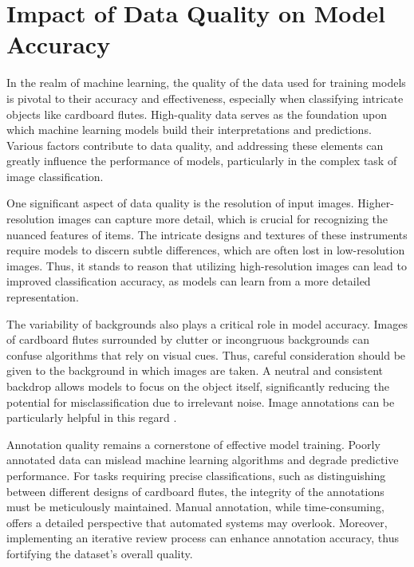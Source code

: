 \section{Impact of Data Quality on Model Accuracy}

In the realm of machine learning, the quality of the data used for training models is pivotal to their accuracy and effectiveness, especially when classifying intricate objects like cardboard flutes. High-quality data serves as the foundation upon which machine learning models build their interpretations and predictions. Various factors contribute to data quality, and addressing these elements can greatly influence the performance of models, particularly in the complex task of image classification.


One significant aspect of data quality is the resolution of input images. Higher-resolution images can capture more detail, which is crucial for recognizing the nuanced features of items. The intricate designs and textures of these instruments require models to discern subtle differences, which are often lost in low-resolution images. Thus, it stands to reason that utilizing high-resolution images can lead to improved classification accuracy, as models can learn from a more detailed representation.


The variability of backgrounds also plays a critical role in model accuracy. Images of cardboard flutes surrounded by clutter or incongruous backgrounds can confuse algorithms that rely on visual cues. Thus, careful consideration should be given to the background in which images are taken. A neutral and consistent backdrop allows models to focus on the object itself, significantly reducing the potential for misclassification due to irrelevant noise. Image annotations can be particularly helpful in this regard \cite{huang2021background}.


Annotation quality remains a cornerstone of effective model training. Poorly annotated data can mislead machine learning algorithms and degrade predictive performance. For tasks requiring precise classifications, such as distinguishing between different designs of cardboard flutes, the integrity of the annotations must be meticulously maintained. Manual annotation, while time-consuming, offers a detailed perspective that automated systems may overlook. Moreover, implementing an iterative review process can enhance annotation accuracy, thus fortifying the dataset's overall quality.


